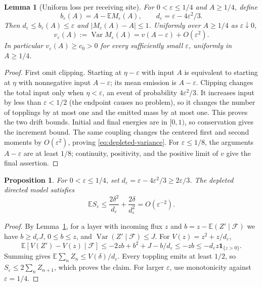 \documentclass[11pt]{article}
\numberwithin{equation}{section}
\newtheorem{proposition}[theorem]{Proposition}
\newtheorem{lemma}[theorem]{Lemma}
\theoremstyle{definition}
\newcommand{\E}{\mathbb E}
\newcommand{\ind}{\mathbf 1}
\newcommand{\Var}{\operatorname{Var}}
\begin{document}
\begin{lemma}[Uniform loss per receiving site]\label{lem:depletion-response}
For $0<\varepsilon\le1/4$ and $A\ge1/4$, define
\[
 b_\varepsilon(A)=A-\E M_\varepsilon(A),\qquad
 d_\varepsilon=\varepsilon-4\varepsilon^2/3.
\]
Then $d_\varepsilon\le b_\varepsilon(A)\le\varepsilon$ and $|M_\varepsilon(A)-A|\le1$. Uniformly over $A\ge1/4$ as $\varepsilon\downarrow0$,
\begin{equation}\label{eq:depleted-variance}
 v_\varepsilon(A):=\Var M_\varepsilon(A)
 =v(A-\varepsilon)+O(\varepsilon^2).
\end{equation}
In particular $v_\varepsilon(A)\ge c_0>0$ for every sufficiently small $\varepsilon$, uniformly in $A\ge1/4$.
\end{lemma}
\begin{proof}
First omit clipping. Starting at $\eta-\varepsilon$ with input $A$ is equivalent to starting at $\eta$ with nonnegative input $A-\varepsilon$; its mean emission is $A-\varepsilon$. Clipping changes the total input only when $\eta<\varepsilon$, an event of probability $4\varepsilon^2/3$. It increases input by less than $\varepsilon<1/2$ (the endpoint causes no problem), so it changes the number of topplings by at most one and the emitted mass by at most one. This proves the two drift bounds. Initial and final energies are in $[0,1)$, so conservation gives the increment bound. The same coupling changes the centered first and second moments by $O(\varepsilon^2)$, proving \eqref{eq:depleted-variance}. For $\varepsilon\le1/8$, the arguments $A-\varepsilon$ are at least $1/8$; continuity, positivity, and the positive limit of $v$ give the final assertion.
\end{proof}

\begin{proposition}\label{prop:depletion}
For $0<\varepsilon\le1/4$, set $d_\varepsilon=\varepsilon-4\varepsilon^2/3\ge2\varepsilon/3$. The depleted directed model satisfies
\begin{equation}\label{eq:depleted-mean}
 \E S_\varepsilon\le\frac{2\delta^2}{d_\varepsilon}
 +\frac{2\delta}{d_\varepsilon^2}=O(\varepsilon^{-2}).
\end{equation}
\end{proposition}
\begin{proof}
By Lemma~\ref{lem:depletion-response}, for a layer with incoming flux $z$ and $b=z-\E(Z'\mid\mathcal F)$ we have $b\ge d_\varepsilon J$, $0\le b\le z$, and $\Var(Z'\mid\mathcal F)\le J$. For $V(z)=z^2+z/d_\varepsilon$,
\[
 \E[V(Z')-V(z)\mid\mathcal F]
 \le-2zb+b^2+J-b/d_\varepsilon
 \le-zb\le-d_\varepsilon z\ind_{\{z>0\}}.
\]
Summing gives $\E\sum_nZ_n\le V(\delta)/d_\varepsilon$. Every toppling emits at least $1/2$, so $S_\varepsilon\le2\sum_nZ_{n+1}$, which proves the claim. For larger $\varepsilon$, use monotonicity against $\varepsilon=1/4$.
\end{proof}
\end{document}
